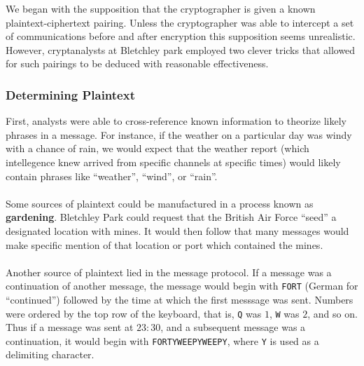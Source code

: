 We began with the supposition that the
cryptographer is given a known plaintext-ciphertext pairing. Unless
the cryptographer was able to intercept
a set of communications before and after encryption this supposition
seems unrealistic. However, cryptanalysts at Bletchley park
employed two clever tricks that allowed for such pairings to be
deduced with reasonable effectiveness.
\subsubsection{Determining Plaintext}
First, analysts were able to cross-reference known information to theorize likely phrases in a
message. For instance, if the weather on a particular day was windy
with a chance of rain, we would expect that the weather report (which
intellegence knew arrived from specific channels at specific times)
would likely contain phrases like ``weather'', ``wind'', or ``rain''.
\\\\Some sources of plaintext could be manufactured in a process known as {\bf{gardening}}. Bletchley Park could request that the British Air Force ``seed'' a designated location with mines. It would then follow that many messages would make specific mention of that location or port which contained the mines.
\\\\Another source of plaintext lied in the message protocol. If a message was a continuation of another message, the message would begin with \texttt{FORT} (German for ``continued'') followed by the time at which the first messsage was sent. Numbers were ordered by the top row of the keyboard, that is, \texttt{Q} was $1$, \texttt{W} was $2$, and so on.  Thus if a message was sent at $23:30$, and a subsequent message was a continuation, it would begin with \texttt{FORTYWEEPYWEEPY}, where \texttt{Y} is used as a delimiting character.

